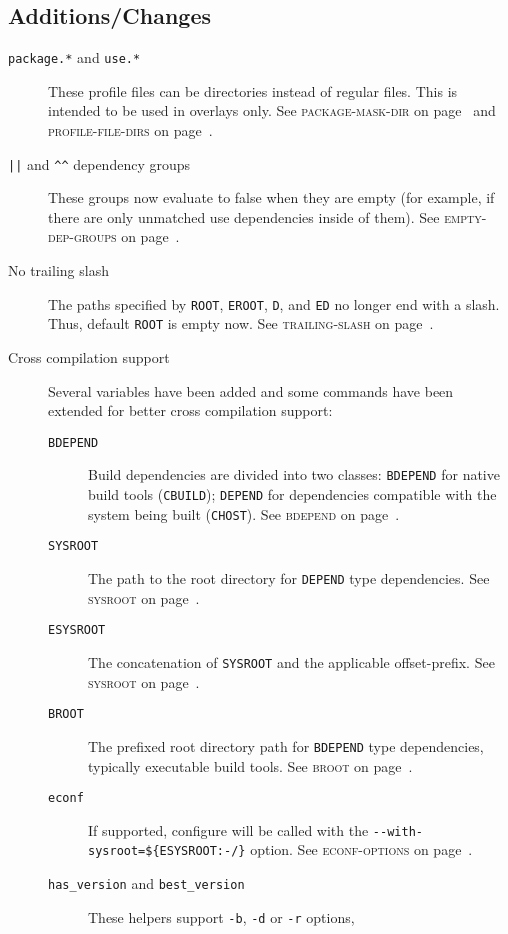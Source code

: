 \documentclass[a4paper,nofoldmark]{leaflet}
\newcommand{\code}[1]{\texttt{#1}}
\newcommand{\featureref}[1]{\textsc{#1} on page~\pageref{feat:#1}}
\begin{document}
\subsection{Additions/Changes}
\label{sec:cs:eapi7-additions}
\begin{description}
    \item[\code{package.*} and \code{use.*}] These profile files can
    be directories instead of regular files. This is intended to be
    used in overlays only.
    See \featureref{package-mask-dir} and \featureref{profile-file-dirs}.
    \item[\code{||} and \code{\textasciicircum\textasciicircum}
    dependency groups] These groups now evaluate to false when they
    are empty (for example, if there are only unmatched use
    dependencies inside of them).
    See \featureref{empty-dep-groups}.
    \item[No trailing slash] The paths specified by \code{ROOT},
    \code{EROOT}, \code{D}, and \code{ED} no longer end with a slash.
    Thus, default \code{ROOT} is empty now.
    See \featureref{trailing-slash}.
    \item[Cross compilation support] Several variables have been added
    and some commands have been extended for better cross compilation
    support:
    \begin{description}
        \item[\code{BDEPEND}] Build dependencies are divided into two
        classes: \code{BDEPEND} for native build tools (\code{CBUILD});
        \code{DEPEND} for dependencies compatible with the system
        being built (\code{CHOST}).
        See \featureref{bdepend}.
        \item[\code{SYSROOT}] The path to the root directory for
        \code{DEPEND} type dependencies.
        See \featureref{sysroot}.
        \item[\code{ESYSROOT}] The concatenation of \code{SYSROOT} and
        the applicable offset-prefix. See \featureref{sysroot}.
        \item[\code{BROOT}] The prefixed root directory path for
        \code{BDEPEND} type dependencies, typically executable build
        tools.
        See \featureref{broot}.
        \item[\code{econf}] If supported, configure will be called
        with the \code{-{}-with-sysroot=\$\{ESYSROOT:-/\}} option.
        See \featureref{econf-options}.
        \item[\code{has_version} and \code{best_version}] These
        helpers support \code{-b}, \code{-d} or \code{-r} options,

\end{description}
\end{description}
\end{document}
